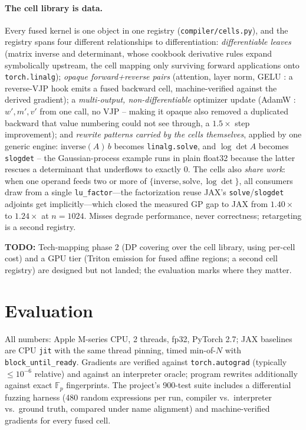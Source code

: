 \documentclass[sigplan,10pt,review]{acmart}
\newcommand{\todopaper}[1]{\par\noindent\colorbox{orange!25}{%
  \parbox{\dimexpr\linewidth-2\fboxsep}{\textbf{TODO:} #1}}\par}
\begin{document}
\paragraph{The cell library is data.} Every fused kernel is one object
in one registry (\texttt{compiler/cells.py}), and the registry spans four
different relationships to differentiation: \emph{differentiable leaves}
(matrix inverse and determinant, whose cookbook derivative rules expand
symbolically upstream, the cell mapping only surviving forward
applications onto \texttt{torch.linalg}); \emph{opaque forward+reverse
pairs} (attention, layer norm, GELU \cite{attention,layernorm,gelu}: a reverse-VJP hook emits a fused
backward cell, machine-verified against the derived gradient);
a \emph{multi-output, non-differentiable} optimizer update (AdamW \cite{adamw}:
$w',m',v'$ from one call, no VJP -- making it opaque also removed a
duplicated backward that value numbering could not see through, a
$1.5\times$ step improvement); and \emph{rewrite patterns carried by the
cells themselves}, applied by one generic engine:
$\mathrm{inverse}(A)\,b$ becomes \texttt{linalg.solve}, and
$\log\det A$ becomes \texttt{slogdet} -- the Gaussian-process example
runs in plain float32 because the latter rescues a determinant that
underflows to exactly $0$. The cells also \emph{share work}: when one
operand feeds two or more of $\{\mathrm{inverse}, \mathrm{solve},
\log\det\}$, all consumers draw from a single
\texttt{lu\_factor}---the factorization reuse JAX's
\texttt{solve}/\texttt{slogdet} adjoints get implicitly---which closed
the measured GP gap to JAX from $1.40\times$ to $1.24\times$ at $n{=}1024$.
Misses degrade performance, never correctness; retargeting is a second
registry.

\todopaper{Tech-mapping phase 2 (DP covering over the cell library,
using per-cell cost) and a GPU tier (Triton \cite{triton} emission for fused affine
regions; a second cell registry) are designed but not landed; the
evaluation marks where they matter.}

\section{Evaluation}\label{sec:eval}

All numbers: Apple M-series CPU, 2 threads, fp32, PyTorch 2.7; JAX
baselines are CPU \texttt{jit} with the same thread pinning, timed
min-of-$N$ with \texttt{block\_until\_ready}. Gradients
are verified against \texttt{torch.autograd} (typically
$\le 10^{-6}$ relative) and against an interpreter oracle; program
rewrites additionally against exact $\mathbb{F}_p$ fingerprints. The
project's 900-test suite includes a differential fuzzing harness
(480 random expressions per run, compiler vs.\ interpreter vs.\
ground truth, compared under name alignment) and machine-verified
gradients for every fused cell.
\end{document}

